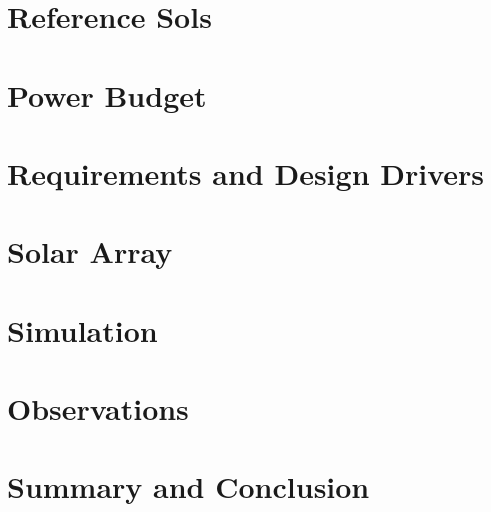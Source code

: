 

\section{Reference Sols}
\label{sec:Design:ReferenceSols}


\section{Power Budget}
\label{sec:Design:PowerBudget}


\section{Requirements and Design Drivers}
\label{sec:Design:RequirementsAndDesignDrivers}


\section{Solar Array}
\label{sec:Design:SolarArray}


\section{Simulation}
\label{sec:Design:Simulation}


\section{Observations}
\label{sec:Design:Observations}


\section{Summary and Conclusion}
\label{sec:Design:SummaryAndConclusion}
